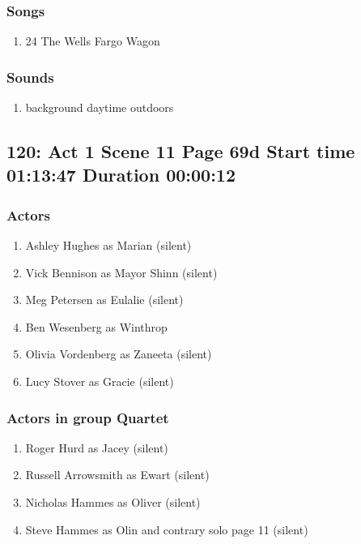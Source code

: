 \subsubsection{Songs}
\begin{enumerate}
\item 24 The Wells Fargo Wagon
\end{enumerate}\subsubsection{Sounds}
\begin{enumerate}
\item background daytime outdoors
\end{enumerate}
\subsection{120: Act 1 Scene 11 Page 69d Start time 01:13:47 Duration 00:00:12}

\subsubsection{Actors}
\begin{enumerate}
\item Ashley Hughes as Marian (silent)
\item Vick Bennison as Mayor Shinn (silent)
\item Meg Petersen as Eulalie (silent)
\item Ben Wesenberg as Winthrop
\item Olivia Vordenberg as Zaneeta (silent)
\item Lucy Stover as Gracie (silent)
\end{enumerate}
\subsubsection{Actors in group Quartet}
\begin{enumerate}
\item Roger Hurd as Jacey (silent)
\item Russell Arrowsmith as Ewart (silent)
\item Nicholas Hammes as Oliver (silent)
\item Steve Hammes as Olin and contrary solo page 11 (silent)
\end{enumerate}

